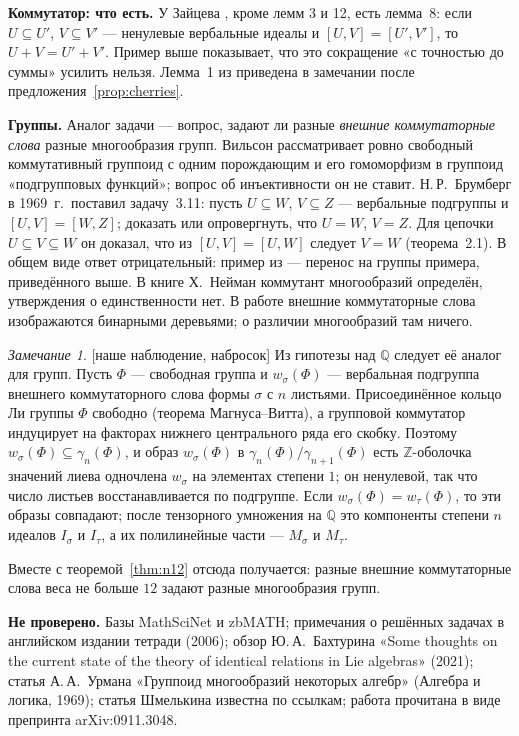 \documentclass[11pt]{article}
\newcommand{\Z}{\mathbb Z}
\newcommand{\Q}{\mathbb Q}
\newcommand{\g}{\gamma}
\newcommand{\stat}[1]{\textsf{\small[#1]}}
\theoremstyle{plain}
\theoremstyle{definition}
\theoremstyle{remark}
\newtheorem{remark}[theorem]{Замечание}
\begin{document}
\textbf{Коммутатор: что есть.} У Зайцева \cite{Z81}, кроме лемм 3 и 12, есть лемма~8: если $U\subseteq U'$, $V\subseteq V'$ --- ненулевые вербальные идеалы и $[U,V]=[U',V']$, то $U+V=U'+V'$. Пример выше показывает, что это сокращение «с точностью до суммы» усилить нельзя. Лемма~1 из \cite{Z98} приведена в замечании после предложения~\ref{prop:cherries}.

\textbf{Группы.} Аналог задачи --- вопрос, задают ли разные \emph{внешние коммутаторные слова} разные многообразия групп. Вильсон \cite{Wil} рассматривает ровно свободный коммутативный группоид с одним порождающим и его гомоморфизм в группоид «подгрупповых функций»; вопрос об инъективности он не ставит. Н.\,Р.~Брумберг \cite{Bru} в 1969~г.\ поставил задачу~3.11: пусть $U\subseteq W$, $V\subseteq Z$ --- вербальные подгруппы и $[U,V]=[W,Z]$; доказать или опровергнуть, что $U=W$, $V=Z$. Для цепочки $U\subseteq V\subseteq W$ он доказал, что из $[U,V]=[U,W]$ следует $V=W$ (теорема~2.1). В общем виде ответ отрицательный: пример из \cite[\S\,3]{Z81} --- перенос на группы примера, приведённого выше. В книге Х.~Нейман \cite{Neu} коммутант многообразий определён, утверждения о единственности нет. В работе \cite{FAM} внешние коммутаторные слова изображаются бинарными деревьями; о различии многообразий там ничего.

\begin{remark}\label{rem:groups} \stat{наше наблюдение, набросок}
Из гипотезы над $\Q$ следует её аналог для групп. Пусть $\Phi$ --- свободная группа и $w_\sigma(\Phi)$ --- вербальная подгруппа внешнего коммутаторного слова формы $\sigma$ с $n$ листьями. Присоединённое кольцо Ли группы $\Phi$ свободно (теорема Магнуса--Витта), а групповой коммутатор индуцирует на факторах нижнего центрального ряда его скобку. Поэтому $w_\sigma(\Phi)\subseteq\g_n(\Phi)$, и образ $w_\sigma(\Phi)$ в $\g_n(\Phi)/\g_{n+1}(\Phi)$ есть $\Z$-оболочка значений лиева одночлена $w_\sigma$ на элементах степени $1$; он ненулевой, так что число листьев восстанавливается по подгруппе. Если $w_\sigma(\Phi)=w_\tau(\Phi)$, то эти образы совпадают; после тензорного умножения на $\Q$ это компоненты степени $n$ идеалов $I_\sigma$ и $I_\tau$, а их полилинейные части --- $M_\sigma$ и $M_\tau$.

Вместе с теоремой~\ref{thm:n12} отсюда получается: разные внешние коммутаторные слова веса не больше $12$ задают разные многообразия групп.
\end{remark}

\textbf{Не проверено.} Базы MathSciNet и zbMATH; примечания о решённых задачах в английском издании тетради (2006); обзор Ю.\,А.~Бахтурина «Some thoughts on the current state of the theory of identical relations in Lie algebras» (2021); статья А.\,А.~Урмана «Группоид многообразий некоторых алгебр» (Алгебра и логика, 1969); статья Шмелькина \cite{Shm} известна по ссылкам; работа \cite{FAM} прочитана в виде препринта arXiv:0911.3048.
\end{document}
